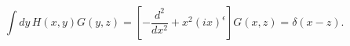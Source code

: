\begin{equation}
\int dy\,H(x,y)G(y,z)=\left[-\frac{d^2}{dx^2}
+x^2(ix)^\epsilon\right]G(x,z)= \delta(x-z). \label{e13}
\end{equation}

